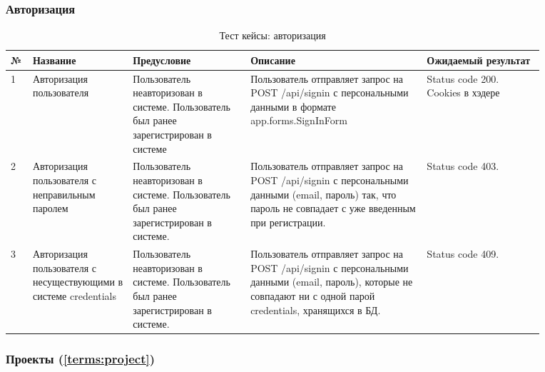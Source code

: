 \documentclass[a4paper,12pt]{article}
\begin{document}
	\clearpage
	\subsubsection{Авторизация}
	\begin{table}[htb]
		\centering
		\begin{tabular}{|p{0.02\linewidth}|p{0.15\linewidth}|p{0.2\linewidth}|p{0.3\linewidth}|p{0.2\linewidth}|} 
			\hline
			\textbf{№} & \textbf{Название} & \textbf{Предусловие} & \textbf{Описание} & \textbf{Ожидаемый результат} \\ \hline
			1 & Авторизация пользователя & Пользователь неавторизован в системе. Пользователь был ранее зарегистрирован в системе & Пользователь отправляет запрос на POST /api/signin с персональными данными в формате app.forms.SignInForm & Status code 200. Cookies в хэдере \\ \hline
			2 & Авторизация пользователя с неправильным паролем  & Пользователь неавторизован в системе. Пользователь был ранее зарегистрирован в системе. & Пользователь отправляет запрос на POST /api/signin с персональными данными (email, пароль) так, что пароль не совпадает с уже введенным при регистрации. & Status code 403. \\
			\hline
			3 & Авторизация пользователя с несуществующими в системе credentials & Пользователь неавторизован в системе. Пользователь был ранее зарегистрирован в системе. & Пользователь отправляет запрос на POST /api/signin с персональными данными (email, пароль), которые не совпадают ни с одной парой credentials, хранящихся в БД. & Status code 409. \\ \hline
		\end{tabular}
	\caption{Тест кейсы: авторизация}
	\end{table}

    \clearpage
	\subsubsection{Проекты (\ref{terms:project})}
	
\end{document}
